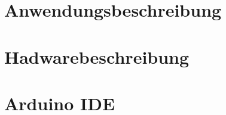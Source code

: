 \documentclass[10pt,a4paper,bibliography=totoc]{scrbook}
\begin{document}
    
   

\tableofcontents
\newpage

\listoffigures
\newpage

\listofcodes
\cleardoublepage

%

\newpage


  

  
\part{Anwendungsbeschreibung}  



\part{Hadwarebeschreibung}  

 
 
 

   
   
  
  
   
%  
%   
   

\part{Arduino IDE}  





\end{document}
